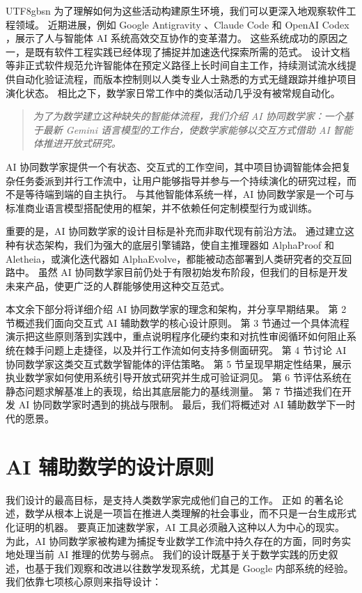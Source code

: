 \documentclass[11pt, a4paper, copyright, gdm]{google}
\begin{document}
\begin{CJK*}{UTF8}{gbsn}
为了理解如何为这些活动构建原生环境，我们可以更深入地观察软件工程领域。
近期进展，例如 Google Antigravity \citep{google2025antigravity}、Claude Code \citep{anthropic2025claudecode} 和 OpenAI Codex \citep{openai2025codex}，展示了人与智能体 AI 系统高效交互协作的变革潜力。
这些系统成功的原因之一，是既有软件工程实践已经体现了捕捉并加速迭代探索所需的范式。
设计文档等非正式软件规范允许智能体在预定义路径上长时间自主工作，持续测试流水线提供自动化验证流程，而版本控制则以人类专业人士熟悉的方式无缝跟踪并维护项目演化状态。
相比之下，数学家日常工作中的类似活动几乎没有被常规自动化。

\begin{quote}\em
    为了为数学建立这种缺失的智能体流程，我们介绍 AI 协同数学家：一个基于最新 Gemini 语言模型的工作台，使数学家能够以交互方式借助 AI 智能体推进开放式研究。
\end{quote}
AI 协同数学家提供一个有状态、交互式的工作空间，其中项目协调智能体会把复杂任务委派到并行工作流中，让用户能够指导并参与一个持续演化的研究过程，而不是等待端到端的自主执行。
与其他智能体系统一样，AI 协同数学家是一个可与标准商业语言模型搭配使用的框架，并不依赖任何定制模型行为或训练。

重要的是，AI 协同数学家的设计目标是补充而非取代现有前沿方法。
通过建立这种有状态架构，我们为强大的底层引擎铺路，使自主推理器如 AlphaProof 和 Aletheia，或演化迭代器如 AlphaEvolve，都能被动态部署到人类研究者的交互回路中。
虽然 AI 协同数学家目前仍处于有限初始发布阶段，但我们的目标是开发未来产品，使更广泛的人群能够使用这种交互范式。

本文余下部分将详细介绍 AI 协同数学家的理念和架构，并分享早期结果。
第 2 节概述我们面向交互式 AI 辅助数学的核心设计原则。
第 3 节通过一个具体流程演示把这些原则落到实践中，重点说明程序化硬约束和对抗性审阅循环如何阻止系统在棘手问题上走捷径，以及并行工作流如何支持多侧面研究。
第 4 节讨论 AI 协同数学家这类交互式数学智能体的评估策略。
第 5 节呈现早期定性结果，展示执业数学家如何使用系统引导开放式研究并生成可验证洞见。
第 6 节评估系统在静态问题求解基准上的表现，给出其底层能力的基线测量。
第 7 节描述我们在开发 AI 协同数学家时遇到的挑战与限制。
最后，我们将概述对 AI 辅助数学下一时代的愿景。


\section{AI 辅助数学的设计原则}

我们设计的最高目标，是支持人类数学家完成他们自己的工作。
正如 \citet{Thurston1994} 的著名论述，数学从根本上说是一项旨在推进人类理解的社会事业，而不只是一台生成形式化证明的机器。
要真正加速数学家，AI 工具必须融入这种以人为中心的现实。
为此，AI 协同数学家被构建为捕捉专业数学工作流中持久存在的方面，同时务实地处理当前 AI 推理的优势与弱点。
我们的设计既基于关于数学实践的历史叙述，也基于我们观察和改进以往数学发现系统，尤其是 Google 内部系统的经验。
我们依靠七项核心原则来指导设计：


\end{CJK*}
\end{document}
